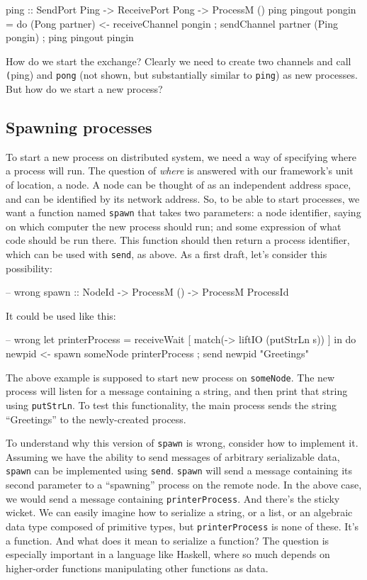 \documentclass[preprint]{sigplanconf}
\begin{document}
\begin{code}
ping :: SendPort Ping -> ReceivePort Pong -> ProcessM ()
ping pingout pongin = 
   do { (Pong partner) <- receiveChannel pongin
      ; sendChannel partner (Ping pongin) 
      ; ping pingout pingin }
\end{code}

How do we start the exchange? Clearly we need to create two channels and call \texttt(ping) and \texttt{pong} (not shown, but substantially similar to \texttt{ping}) as new processes. But how do we start a new process?

\subsection{Spawning processes}

To start a new process on distributed system, we need a way of specifying where a process will run. The question of {\em where} is answered with our framework's unit of location, a node. A node can be thought of as an independent address space, and can be identified by its network address. So, to be able to start processes, we want a function named \texttt{spawn} that takes two parameters: a node identifier, saying on which computer the new process should run; and some expression of what code should be run there. This function should then return a process identifier, which can be used with \texttt{send}, as above. As a first draft, let's consider this possibility:

\begin{code}
-- wrong
spawn :: NodeId -> ProcessM () -> ProcessM ProcessId
\end{code}

It could be used like this:

\begin{code}
-- wrong
let printerProcess = receiveWait [
      match(\s -> liftIO (putStrLn s)) ]
 in do { newpid <- spawn someNode printerProcess
       ; send newpid "Greetings" }
\end{code}

The above example is supposed to start new process on \texttt{someNode}. The new process will listen for a message containing a string, and then print that string using \texttt{putStrLn}. To test this functionality, the main process sends the string ``Greetings'' to the newly-created process.

To understand why this version of \texttt{spawn} is wrong, consider how to implement it. Assuming we have the ability to send messages of arbitrary serializable data, \texttt{spawn} can be implemented using \texttt{send}.  \texttt{spawn} will send a message containing its second parameter to a ``spawning'' process on the remote node. In the above case, we would send a message containing \texttt{printerProcess}. And there's the sticky wicket. We can easily imagine how to serialize a string, or a list, or an algebraic data type composed of primitive types, but \texttt{printerProcess} is none of these. It's a function. And what does it mean to serialize a function? The question is especially important in a language like Haskell, where so much depends on higher-order functions manipulating other functions as data.
\end{document}
